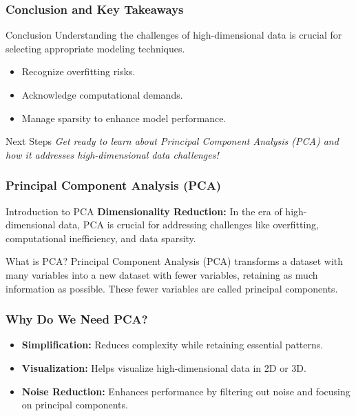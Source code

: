 \documentclass[aspectratio=169]{beamer}
\begin{document}
\begin{frame}[fragile]
    \frametitle{Conclusion and Key Takeaways}
    \begin{block}{Conclusion}
        Understanding the challenges of high-dimensional data is crucial for selecting appropriate modeling techniques.
    \end{block}
    \begin{itemize}
        \item Recognize overfitting risks.
        \item Acknowledge computational demands.
        \item Manage sparsity to enhance model performance.
    \end{itemize}
    \begin{block}{Next Steps}
        \textit{Get ready to learn about Principal Component Analysis (PCA) and how it addresses high-dimensional data challenges!}
    \end{block}
\end{frame}

\begin{frame}[fragile]
    \frametitle{Principal Component Analysis (PCA)}
    \begin{block}{Introduction to PCA}
        \textbf{Dimensionality Reduction:} In the era of high-dimensional data, PCA is crucial for addressing challenges like overfitting, computational inefficiency, and data sparsity.
    \end{block}

    \begin{block}{What is PCA?}
        Principal Component Analysis (PCA) transforms a dataset with many variables into a new dataset with fewer variables, retaining as much information as possible. These fewer variables are called principal components.
    \end{block}
\end{frame}

\begin{frame}[fragile]
    \frametitle{Why Do We Need PCA?}
    \begin{itemize}
        \item \textbf{Simplification:} Reduces complexity while retaining essential patterns.
        \item \textbf{Visualization:} Helps visualize high-dimensional data in 2D or 3D.
        \item \textbf{Noise Reduction:} Enhances performance by filtering out noise and focusing on principal components.
    \end{itemize}
\end{frame}
\end{document}
